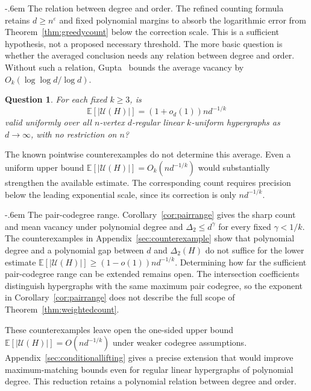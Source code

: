 \documentclass[11pt,reqno]{amsart}
\makeatletter
\numberwithin{equation}{section}
\renewcommand{\paragraph}{\@startsection{paragraph}{4}%
    \z@{.75\linespacing\@plus.2\linespacing\@minus.1\linespacing}%
    {-.6em}%
    {\normalfont\bfseries}}
\theoremstyle{plain}
\newtheorem{question}[theorem]{Question}
\theoremstyle{definition}
\newcommand{\E}{\mathbb E}
\newcommand{\eps}{\varepsilon}
\newcommand{\calU}{\mathcal U}
\makeatother
\begin{document}
\paragraph{The relation between degree and order.}
The refined counting formula retains $d\ge n^\eps$ and fixed polynomial margins to absorb the logarithmic error from Theorem~\ref{thm:greedycount} below the correction scale.
This is a sufficient hypothesis, not a proposed necessary threshold.
The more basic question is whether the averaged conclusion needs any relation between degree and order.
Without such a relation, Gupta~\cite{Gupta} bounds the average vacancy by $O_k(\log\log d/\log d)$.

\begin{question}\label{ques:averagedvacancy}
    For each fixed $k\ge3$, is
    \[
        \E[|\calU(H)|]=(1+o_d(1))nd^{-1/k}
    \]
    valid uniformly over all $n$-vertex $d$-regular linear $k$-uniform hypergraphs as $d\to\infty$, with no restriction on $n$?
\end{question}

The known pointwise counterexamples do not determine this average.
Even a uniform upper bound $\E[|\calU(H)|]=O_k(nd^{-1/k})$ would substantially strengthen the available estimate.
The corresponding count requires precision below the leading exponential scale, since its correction is only $nd^{-1/k}$.

\paragraph{The pair-codegree range.}
Corollary~\ref{cor:pairrange} gives the sharp count and mean vacancy under polynomial degree and $\Delta_2\le d^\gamma$ for every fixed $\gamma<1/k$.
The counterexamples in Appendix~\ref{sec:counterexample} show that polynomial degree and a polynomial gap between $d$ and $\Delta_2(H)$ do not suffice for the lower estimate $\E[|\calU(H)|]\ge(1-o(1))nd^{-1/k}$.
Determining how far the sufficient pair-codegree range can be extended remains open.
The intersection coefficients distinguish hypergraphs with the same maximum pair codegree, so the exponent in Corollary~\ref{cor:pairrange} does not describe the full scope of Theorem~\ref{thm:weightedcount}.

These counterexamples leave open the one-sided upper bound $\E[|\calU(H)|]=O(nd^{-1/k})$ under weaker codegree assumptions.
Appendix~\ref{sec:conditionallifting} gives a precise extension that would improve maximum-matching bounds even for regular linear hypergraphs of polynomial degree.
This reduction retains a polynomial relation between degree and order.
\end{document}
